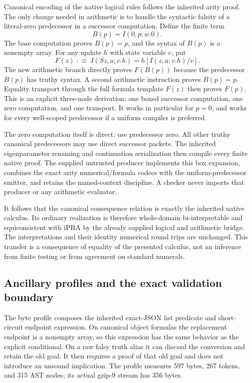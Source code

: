 \documentclass[11pt,letterpaper]{article}
\theoremstyle{definition}\newtheorem{definition}[theorem]{Definition}
\theoremstyle{remark}\newtheorem{remark}[theorem]{Remark}
\begin{document}
Canonical encoding of the native logical rules follows the inherited
arity proof.  The only change needed in arithmetic is to handle the
syntactic falsity of a literal-zero predecessor in a successor
computation.
Define the finite term
\[
                         B(p)=I(0,p;w.0).
\]
The base computation proves $B(p)=p$, and the syntax of $B(p)$ is a
nonempty array.  For any update $h$ with state variable $v$, put
\[
 F(z)\;:\equiv\;
 I(Sz,a;v.h)=h[I(z,a;v.h)/v].
\]
The new arithmetic branch directly proves $F(B(p))$ because the
predecessor $B(p)$ has truthy syntax.  A second arithmetic instruction
proves $B(p)=p$.  Equality transport through the full formula template
$F(z)$ then proves $F(p)$.  This is an explicit three-node derivation:
one boxed successor computation, one zero computation, and one
transport.  It works in particular for $p=0$, and works for every
well-scoped predecessor if a uniform compiler is preferred.

The zero computation itself is direct: use predecessor zero.  All
other truthy canonical predecessors may use direct successor packets.
The inherited eigenparameter renaming and continuation serialization
then compile every finite native proof.  The supplied untrusted
producer implements this box expansion, combines the exact arity
numerical/formula codecs with the uniform-predecessor emitter, and
retains the named-context discipline.  A checker never imports that
producer or any arithmetic evaluator.

It follows that the canonical consequence relation is exactly the
inherited native calculus.  Its ordinary realization is therefore
whole-domain bi-interpretable and equiconsistent with iPRA by the
already supplied logical and arithmetic bridge.  The interpretations
and their identity numerical round trips are unchanged.  This transfer
is a consequence of equality of the presented calculus, not an inference
from finite testing or from agreement on standard numerals.

\subsection{Ancillary profiles and the exact validation boundary}

The byte profile composes the inherited exact-JSON list predicate and
short-circuit endpoint expression.  On canonical object formulas the
replacement endpoint is a nonempty array, so this expression has the
same behavior as the explicit conditional.  On a raw falsy truth alias
it can discard the conversion and retain the old goal.  It then requires
a proof of that old goal and does not introduce an unsound implication.
The profile measures 597 bytes, 267 tokens, and 315 AST nodes; its
actual gzip-9 stream has 356 bytes.
\end{document}
